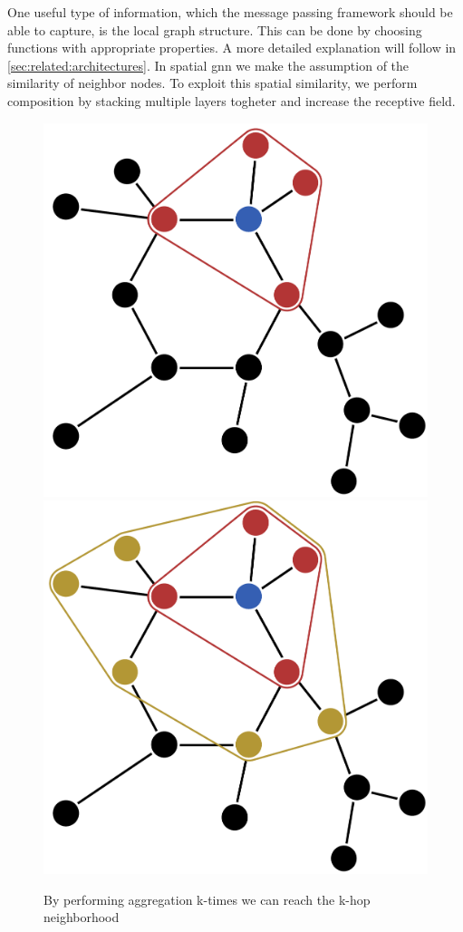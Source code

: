 One useful type of information, which the message passing framework should be able to
capture, is the local graph structure. This can be done by choosing functions with
appropriate properties. A more detailed explanation will follow in
\cref{sec:related:architectures}. In spatial \ac{gnn} we make the assumption of the
similarity of neighbor nodes. To exploit this spatial similarity, we perform
composition by stacking multiple layers togheter and increase the receptive field.

\begin{figure}[ht]
    \centering
    \includegraphics[width=0.35\linewidth]{gfx/related-work/1hop}\hspace{1cm}
    \includegraphics[width=0.35\linewidth]{gfx/related-work/2hop}
    \caption{By performing aggregation k-times we can reach the k-hop neighborhood}\label{fig:related:1hop}
\end{figure}


